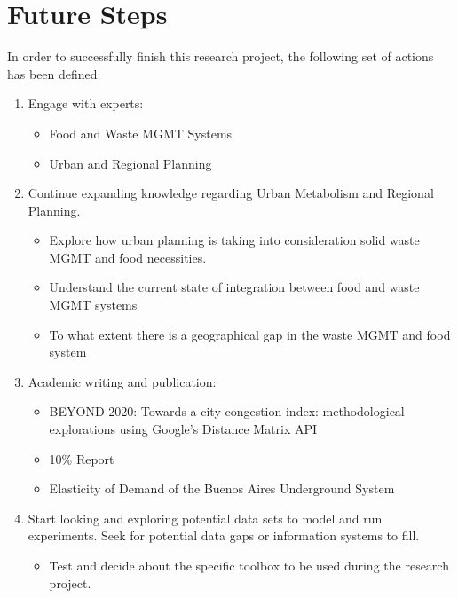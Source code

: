 \section{Future Steps}
In order to successfully finish this research project, the following set of actions has been defined. 

\begin{enumerate}
    \item Engage with experts:
    \begin{itemize}
        \item Food and Waste MGMT Systems
        \item Urban and Regional Planning
    \end{itemize}
    \item Continue expanding knowledge regarding Urban Metabolism and Regional Planning.
    \begin{itemize}
        \item Explore how urban planning is taking into consideration solid waste MGMT and food necessities.
        \item Understand the current state of integration between food and waste MGMT systems
        \item To what extent there is a geographical gap in the waste MGMT and food system
        \end{itemize}
    \item Academic writing and publication:
    \begin{itemize}
        \item BEYOND 2020: Towards a city congestion index: methodological explorations using Google’s Distance Matrix API
        \item 10\% Report 
        \item Elasticity of Demand of the Buenos Aires Underground System
        \end{itemize}
    \item Start looking and exploring potential data sets to model and run experiments. Seek for potential data gaps or information systems to fill.
    \begin{itemize}
        \item Test and decide about the specific toolbox to be used during the research project.
    \end{itemize}
\end{enumerate}

